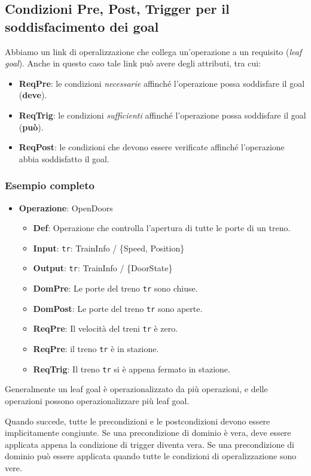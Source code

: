 \subsection{Condizioni Pre, Post, Trigger per il soddisfacimento dei goal}
Abbiamo un link di operalizzazione che collega un'operazione a un requisito (\textit{leaf goal}).
Anche in questo caso tale link può avere degli attributi, tra cui:
\begin{itemize}
    \item \textbf{ReqPre}: le condizioni \textit{necessarie} affinché l'operazione possa
    soddisfare il goal (\textbf{deve}).
    \item \textbf{ReqTrig}: le condizioni \textit{sufficienti} affinché l'operazione possa
    soddisfare il goal (\textbf{può}).
    \item \textbf{ReqPost}: le condizioni che devono essere verificate affinché l'operazione
    abbia soddisfatto il goal.
\end{itemize}

\subsubsection{Esempio completo}
\begin{itemize}
    \item \textbf{Operazione}: OpenDoors
    \begin{itemize}
        \item \textbf{Def}: Operazione che controlla l'apertura di tutte le porte
        di un treno.
        \item \textbf{Input}: \texttt{tr}: TrainInfo / \{Speed, Position\}
        \item \textbf{Output}: \texttt{tr}: TrainInfo / \{DoorState\}
        \item \textbf{DomPre}: Le porte del treno \texttt{tr} sono chiuse.
        \item \textbf{DomPost}: Le porte del treno \texttt{tr} sono aperte.
        \item \textbf{ReqPre}: Il velocità del treni \texttt{tr} è zero.
        \item \textbf{ReqPre}: il treno \texttt{tr} è in stazione.
        \item \textbf{ReqTrig}: Il treno \texttt{tr} si è appena fermato in stazione.
    \end{itemize}
\end{itemize}

\begin{tcolorbox}
    Generalmente un leaf goal è operazionalizzato da più operazioni, e delle operazioni possono
    operazionalizzare più leaf goal.
\end{tcolorbox}
Quando succede, tutte le precondizioni e le postcondizioni devono essere implicitamente
congiunte.
Se una precondizione di dominio è vera, deve essere applicata appena la condizione di trigger 
diventa vera. Se una precondizione di dominio può essere applicata quando 
tutte le condizioni di operalizzazione sono vere.

